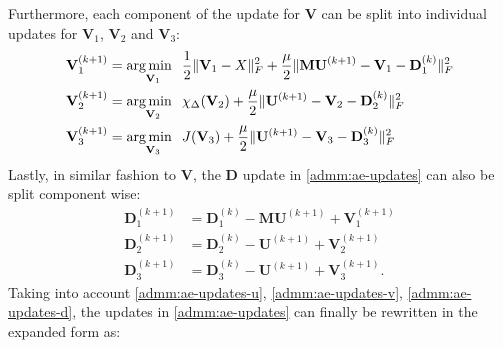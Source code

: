 Furthermore, each component of the update for $\mathbf{V}$ can be split into individual updates for $\mathbf{V}_1$, $\mathbf{V}_2$ and $\mathbf{V}_3$:
\begin{equation}
  \label{admm:ae-updates-v}
  \begin{aligned}
    \mathbf{V}_1^{(k+1)} &= \operatorname*{arg\,min \;\;}_{\mathbf{V}_1} \frac{1}{2} \|\mathbf{V}_1 - X \|_F^2 + \frac{\mu}{2} \|\mathbf{MU}^{(k+1)} - \mathbf{V}_1 - \mathbf{D}_1^{(k)}\|_F^2 \\
    \mathbf{V}_2^{(k+1)} &= \operatorname*{arg\,min \;\;}_{\mathbf{V}_2} \chi_{\Delta}(\mathbf{V}_2) + \frac{\mu}{2} \|\mathbf{U}^{(k+1)} - \mathbf{V}_2 - \mathbf{D}_2^{(k)}\|_F^2 \\
    \mathbf{V}_3^{(k+1)} &= \operatorname*{arg\,min \;\;}_{\mathbf{V}_3} J(\mathbf{V}_3) + \frac{\mu}{2} \|\mathbf{U}^{(k+1)} - \mathbf{V}_3 - \mathbf{D}_3^{(k)}\|_F^2
  \end{aligned}
\end{equation}
Lastly, in similar fashion to $\mathbf{V}$, the $\mathbf{D}$ update in \eqref{admm:ae-updates} can also be split component wise:
\begin{equation}
  \label{admm:ae-updates-d}
  \begin{aligned}
    \mathbf{D}_1^{(k+1)} &= \mathbf{D}_1^{(k)} - \mathbf{MU}^{(k+1)} + \mathbf{V}_1^{(k+1)} \\
    \mathbf{D}_2^{(k+1)} &= \mathbf{D}_2^{(k)} - \mathbf{U}^{(k+1)} + \mathbf{V}_2^{(k+1)} \\
    \mathbf{D}_3^{(k+1)} &= \mathbf{D}_3^{(k)} - \mathbf{U}^{(k+1)} + \mathbf{V}_3^{(k+1)}.
  \end{aligned}
\end{equation}
Taking into account \eqref{admm:ae-updates-u}, \eqref{admm:ae-updates-v}, \eqref{admm:ae-updates-d}, the updates in \eqref{admm:ae-updates} can finally be rewritten in the expanded form as:
